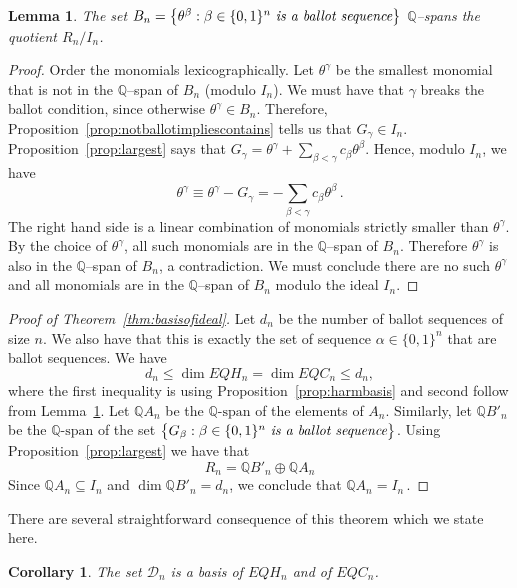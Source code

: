 \documentclass[11pt]{amsart}
\newtheorem{cor}[theorem]{Corollary}
\newtheorem{lemma}[theorem]{Lemma}
\theoremstyle{definition}
\numberwithin{equation}{section}
\begin{document}
\begin{lemma}\label{lem:spanofquotient}
The set $B_n=\big\{ \theta^\beta : \beta \in \{0,1\}^n \text{ \it is a ballot sequence}\big\}$
$\mathbb Q$--spans the quotient $R_n\big/I_n$.
\end{lemma}

\begin{proof}
Order the monomials lexicographically. Let  $\theta^\gamma$ be the smallest monomial that is not in the $\mathbb Q$--span of $B_n$
(modulo  $I_n$). We must have  that $\gamma$ breaks the ballot condition,
since otherwise $\theta^\gamma\in  B_n$. Therefore, Proposition~\ref{prop:notballotimpliescontains}
tells us  that $G_\gamma \in I_n$. Proposition~\ref{prop:largest} says that $G_\gamma = \theta^\gamma + \sum_{\beta<\gamma}  c_\beta \theta^\beta$. Hence, modulo $I_n$, we have
$$ \theta^\gamma \equiv \theta^\gamma - G_\gamma = - \sum_{\beta<\gamma} c_\beta \theta^\beta\,.$$
The right hand side is a linear combination of monomials strictly smaller than $\theta^\gamma$.
By the choice of $\theta^\gamma$, all such monomials are in the $\mathbb Q$--span of $B_n$.
 Therefore $\theta^\gamma$ is also in the $\mathbb Q$--span of $B_n$, a contradiction. We must conclude there are no such $\theta^\gamma$ and all monomials are in the $\mathbb Q$--span of $B_n$ modulo the ideal $I_n$.
\end{proof}

\begin{proof}[Proof of Theorem~\ref{thm:basisofideal}]
Let $d_n$ be the number of ballot sequences of size $n$. We also have that this is exactly the set of sequence $\alpha\in\{0,1\}^n$ that are ballot sequences.
We have
$$ d_n\le \dim EQH_n = \dim EQC_n \le d_n,$$
where the first inequality is using Proposition~\ref{prop:harmbasis} and second follow from Lemma~\ref{lem:spanofquotient}.
Let ${\mathbb Q}A_n$ be the ${\mathbb Q}\text{-span}$ of the elements of $A_n$.
Similarly, let ${\mathbb Q}B'_n$ be the ${\mathbb Q}\text{-span}$ of the set $\big\{ G_\beta : \beta \in \{0,1\}^n \text{ \it is a ballot sequence}\big\}$.
Using Proposition~\ref{prop:largest} we have that
$$R_n ={\mathbb Q}B'_n \oplus  {\mathbb Q}A_n 
$$
Since ${\mathbb Q}A_n \subseteq I_n$ and $\dim {\mathbb Q}B'_n = d_n$, we conclude that ${\mathbb Q}A_n = I_n\,.$
\end{proof}

There are several straightforward consequence of this theorem which we state here.

\begin{cor} The set ${\mathcal D}_n$ is a basis of $EQH_n$ and of $EQC_n$.
\end{cor}
\end{document}

